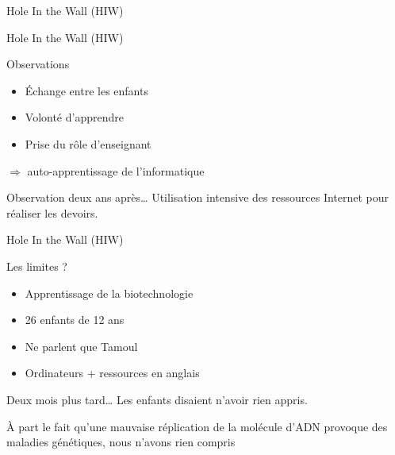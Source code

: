 \begin{frame}{Hole In the Wall (HIW)}

    
\end{frame}

\begin{frame}{Hole In the Wall (HIW)}
  \begin{block}{Observations}
    \begin{itemize}
      \item Échange entre les enfants
      \item Volonté d'apprendre
      \item Prise du rôle d'enseignant
    \end{itemize}
    $\Rightarrow$ auto-apprentissage de l'informatique
  \end{block}
  
  \pause
  \begin{block}{Observation deux ans après\ldots}
    Utilisation intensive des ressources Internet pour réaliser les devoirs.
  \end{block}
\end{frame}


\begin{frame}{Hole In the Wall (HIW)}

  \begin{block}{Les limites ?}
    \begin{itemize}
      \item Apprentissage de la biotechnologie
      \item 26 enfants de 12 ans
      \item Ne parlent que Tamoul
      \item Ordinateurs + ressources en anglais
    \end{itemize}
  \end{block}

  \pause
  \begin{block}{Deux mois plus tard\ldots}
    Les enfants disaient n'avoir rien appris.
    \pause
    
    \begin{coolquote}
    À part le fait qu'une mauvaise réplication de la molécule d'ADN provoque des maladies génétiques, nous n'avons rien compris
    \end{coolquote}
  \end{block}
\end{frame}

